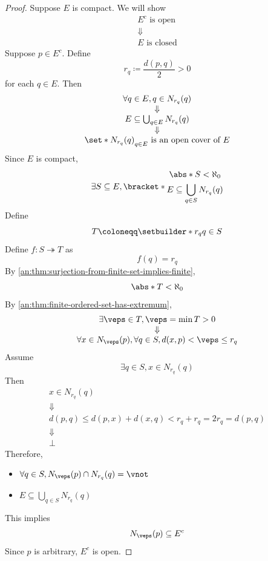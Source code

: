 \begin{proof}
  Suppose $E$ is compact. We will show
  \[
    \begin{array}{c}
      E^{c} \text{ is open} \\
      \Downarrow            \\
      E \text{ is closed}
    \end{array}
  \]
  Suppose $p \in E^{c}$. Define
  \[
    r_{q} \coloneqq \frac{d(p, q)}{2} > 0
  \]
  for each $q \in E$. Then
  \[
    \begin{array}{c}
      \forall q \in E, q \in N_{r_{q}}(q)        \\
      \Downarrow                                 \\
      E \subseteq \bigcup_{q \in E} N_{r_{q}}(q) \\
      \Downarrow                                 \\
      \set*{N_{r_{q}}(q)}_{q \in E} \text{ is an open cover of } E
    \end{array}
  \]
  Since $E$ is compact,
  \[
    \exists S \subseteq E,
    \bracket*{\begin{gathered}
        \abs*{S} < \aleph_{0} \\
        E \subseteq \bigcup_{q \in S} N_{r_{q}}(q)
      \end{gathered}}
  \]
  Define
  \[
    T \coloneqq \setbuilder*{r_{q}}{q \in S}
  \]
  Define $f: S \twoheadrightarrow T$ as
  \[
    f(q) = r_{q}
  \]
  By \cref{an:thm:surjection-from-finite-set-implies-finite},
  \[
    \abs*{T} < \aleph_{0}
  \]
  By \cref{an:thm:finite-ordered-set-has-extremum},
  \[
    \begin{array}{c}
      \exists \veps \in T, \veps = \min T > 0 \\
      \Downarrow                              \\
      \forall x \in N_{\veps}(p), \forall q \in S, d(x, p) < \veps \leq r_{q}
    \end{array}
  \]
  Assume
  \[
    \exists q \in S, x \in N_{r_{q}}(q)
  \]
  Then
  \[
    \begin{array}{c}
      x \in N_{r_{q}}(q)                                                \\
      \Downarrow                                                        \\
      d(p, q) \leq d(p, x) + d(x, q) < r_{q} + r_{q} = 2r_{q} = d(p, q) \\
      \Downarrow                                                        \\
      \bot
    \end{array}
  \]
  Therefore,
  \begin{itemize}
    \item $\forall q \in S, N_{\veps}(p) \cap N_{r_{q}}(q) = \vnot$
    \item $E \subseteq \bigcup_{q \in S} N_{r_{q}}(q)$
  \end{itemize}
  This implies
  \[
    N_{\veps}(p) \subseteq E^{c}
  \]
  Since $p$ is arbitrary, $E^{c}$ is open.
\end{proof}
